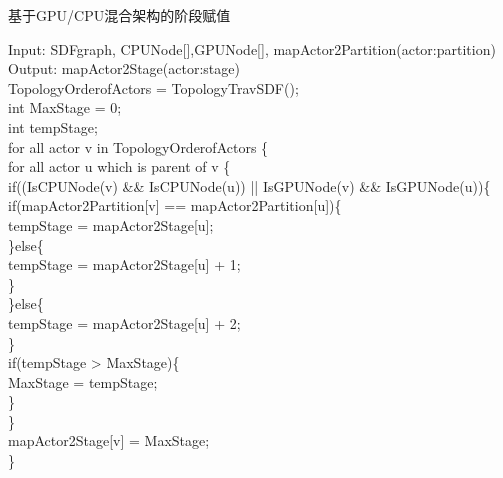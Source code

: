 \begin{algorithm}
  \caption{基于GPU/CPU混合架构的阶段赋值}
  \label{algo:gpucpu}
  Input: SDFgraph, CPUNode[],GPUNode[], mapActor2Partition(actor:partition)\\
  Output: mapActor2Stage(actor:stage)\\
  TopologyOrderofActors = TopologyTravSDF();\\
  int MaxStage = 0;\\
  int tempStage;\\
  for all actor v in TopologyOrderofActors \{\\
    \hspace*{1 pc} for all actor u which is parent of v \{\\
    \hspace*{2 pc} if((IsCPUNode(v) \&\& IsCPUNode(u)) || IsGPUNode(v) \&\& IsGPUNode(u))\{\\
    \hspace*{3 pc} if(mapActor2Partition[v] == mapActor2Partition[u])\{\\
    \hspace*{4 pc} tempStage = mapActor2Stage[u];\\
    \hspace*{3 pc} \}else\{\\
    \hspace*{4 pc} tempStage = mapActor2Stage[u] + 1;\\
    \hspace*{3 pc} \}\\
    \hspace*{2 pc} \}else\{\\
    \hspace*{3 pc} tempStage = mapActor2Stage[u] + 2;\\
    \hspace*{2 pc} \}\\
    \hspace*{2 pc} if(tempStage > MaxStage)\{\\
    \hspace*{3 pc} MaxStage = tempStage;\\
    \hspace*{2 pc} \}\\
    \hspace*{1 pc} \}\\
    \hspace*{1 pc} mapActor2Stage[v] = MaxStage;\\
  \}
\end{algorithm}

